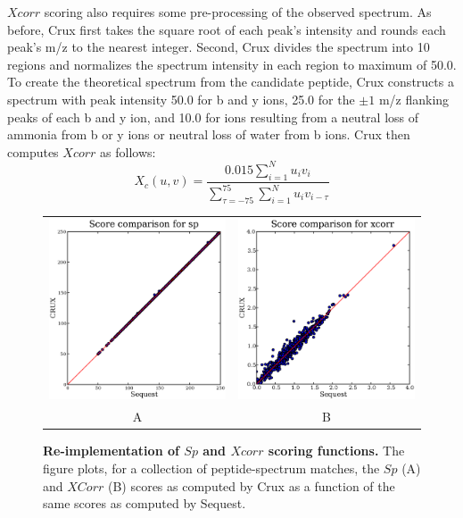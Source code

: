 \documentclass[12pt]{article}
\begin{document}
$Xcorr$ scoring also requires some pre-processing of the observed
spectrum.  As before, Crux first takes the square root of each peak's
intensity and rounds each peak's m/z to the nearest integer.  Second,
Crux divides the spectrum into 10 regions and normalizes the spectrum
intensity in each region to maximum of 50.0. To create the theoretical
spectrum from the candidate peptide, Crux constructs a spectrum with
peak intensity 50.0 for b and y ions, 25.0 for the $\pm 1$ m/z flanking
peaks of each b and y ion, and 10.0 for ions resulting from a neutral
loss of ammonia from b or y ions or neutral loss of water from b ions.
Crux then computes $Xcorr$ as follows:
\[
X_c(u, v) = \frac{0.015\sum_{i=1}^N u_i v_i}
{\sum_{\tau=-75}^{75} \sum_{i=1}^N u_i v_{i-\tau}}
\]

\begin{figure}
  \centering
  \begin{tabular}{cc}
    \includegraphics[width=3in]{./Images/random-sp.eps} &
    \includegraphics[width=3in]{./Images/random-xcorr.eps} \\
  A & B \\
  \end{tabular}
  \caption{{\bf Re-implementation of $Sp$ and $Xcorr$ scoring functions.}
  The figure plots, for a collection of peptide-spectrum matches, the
  $Sp$ (A) and $XCorr$ (B) scores as computed by Crux as a function of the
  same scores as computed by {\sc Sequest}.
  \label{figure:sp-xcorr}}
\end{figure}
\end{document}
